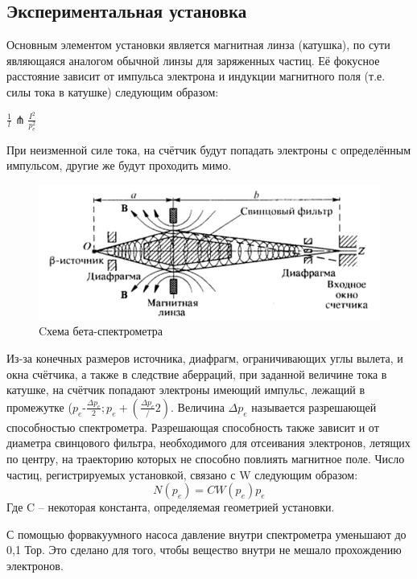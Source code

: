 \documentclass[12pt,a4paper]{article}
\begin{document}
\subsection{Экспериментальная установка}

Основным элементом установки является магнитная линза (катушка), по сути являющаяся аналогом обычной линзы для заряженных частиц. Её фокусное расстояние зависит от импульса электрона и индукции магнитного поля (т.е. силы тока в катушке) следующим образом:

\begin{center}
$\frac{1}{l} \pitchfork \frac{I^2}{p_e^2}$
\end{center}

При неизменной силе тока, на счётчик будут попадать электроны с определённым импульсом, другие же будут проходить мимо. 

\begin{figure}[h]
\includegraphics[scale = 0.7]{5.4.2-2}
\centering
\caption{Cхема бета-спектрометра}
\end{figure}

     Из-за конечных размеров источника, диафрагм, ограничивающих углы вылета, и окна счётчика, а также в следствие аберраций, при заданной величине тока в катушке, на счётчик попадают электроны имеющий импульс, лежащий в промежутке ($p_e$-$\frac{\Delta p_e}{2} ; p_e + (\frac{\Delta p_e}/{2})$. Величина $\Delta p_e$ называется разрешающей способностью спектрометра. Разрешающая способность также зависит и от диаметра свинцового фильтра, необходимого для отсеивания электронов, летящих по центру, на траекторию которых не способно повлиять магнитное поле. 
     Число частиц, регистрируемых установкой, связано с W следующим образом:
     \begin{equation}  
N(p_e )=CW(p_e ) p_e
     \end{equation}
Где C – некоторая константа, определяемая геометрией установки.

     С помощью форвакуумного насоса давление внутри спектрометра уменьшают до 0,1 Тор. Это сделано для того, чтобы вещество внутри не мешало прохождению электронов. 
\end{document}
